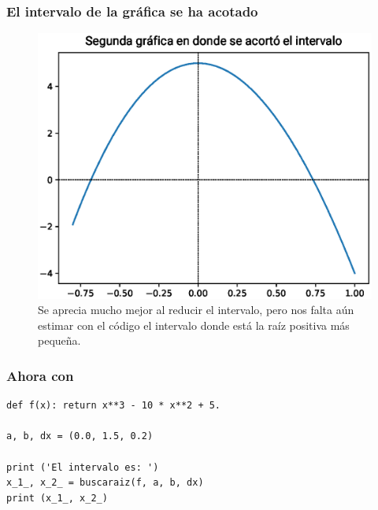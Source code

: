 \begin{frame}
\frametitle{El intervalo de la gráfica se ha acotado}
\begin{figure}
	\centering
	\includegraphics[scale=0.5]{Imagenes/aprox_sucesivas_02.eps}
	\caption{Se aprecia mucho mejor al reducir el intervalo, pero nos falta aún estimar con el código el intervalo donde está la raíz positiva más pequeña.} 
\end{figure}
\end{frame}
\begin{frame}[fragile]
\frametitle{Ahora con \python}
\begin{lstlisting}[caption=Solución con python, style=FormattedNumber, basicstyle=\linespread{1.1}\ttfamily=\small, columns=fullflexible]
def f(x): return x**3 - 10 * x**2 + 5.

a, b, dx = (0.0, 1.5, 0.2)

print ('El intervalo es: ')
x_1_, x_2_ = buscaraiz(f, a, b, dx)
print (x_1_, x_2_)
\end{lstlisting}
\end{frame}
